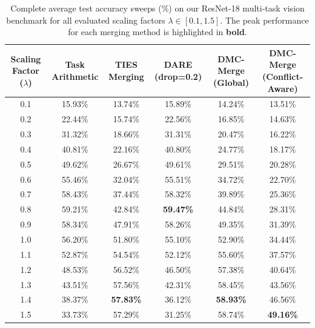 \documentclass{article}
\begin{document}
\begin{table}[t]
\caption{Complete average test accuracy sweeps (\%) on our ResNet-18 multi-task vision benchmark for all evaluated scaling factors $\lambda \in [0.1, 1.5]$. The peak performance for each merging method is highlighted in \textbf{bold}.}
\label{tab:full_average_sweep}
\vskip 0.15in
\begin{center}
\begin{small}
\begin{tabular}{cccccc}
\toprule
\textbf{Scaling Factor ($\lambda$)} & \textbf{Task Arithmetic} & \textbf{TIES Merging} & \textbf{DARE (drop=0.2)} & \textbf{DMC-Merge (Global)} & \textbf{DMC-Merge (Conflict-Aware)} \\
\midrule
0.1 & 15.93\% & 13.74\% & 15.89\% & 14.24\% & 13.51\% \\
0.2 & 22.44\% & 15.74\% & 22.56\% & 16.85\% & 14.63\% \\
0.3 & 31.32\% & 18.66\% & 31.31\% & 20.47\% & 16.22\% \\
0.4 & 40.81\% & 22.16\% & 40.80\% & 24.77\% & 18.17\% \\
0.5 & 49.62\% & 26.67\% & 49.61\% & 29.51\% & 20.28\% \\
0.6 & 55.46\% & 32.04\% & 55.51\% & 34.72\% & 22.70\% \\
0.7 & 58.43\% & 37.44\% & 58.32\% & 39.89\% & 25.36\% \\
0.8 & 59.21\% & 42.84\% & \textbf{59.47\%} & 44.84\% & 28.31\% \\
0.9 & 58.34\% & 47.91\% & 58.26\% & 49.35\% & 31.39\% \\
1.0 & 56.20\% & 51.80\% & 55.10\% & 52.90\% & 34.44\% \\
1.1 & 52.87\% & 54.54\% & 52.12\% & 55.60\% & 37.57\% \\
1.2 & 48.53\% & 56.52\% & 46.50\% & 57.38\% & 40.64\% \\
1.3 & 43.51\% & 57.56\% & 42.31\% & 58.45\% & 43.56\% \\
1.4 & 38.37\% & \textbf{57.83\%} & 36.12\% & \textbf{58.93\%} & 46.56\% \\
1.5 & 33.73\% & 57.29\% & 31.25\% & 58.74\% & \textbf{49.16\%} \\
\bottomrule
\end{tabular}
\end{small}
\end{center}
\vskip -0.1in
\end{table}
\end{document}

